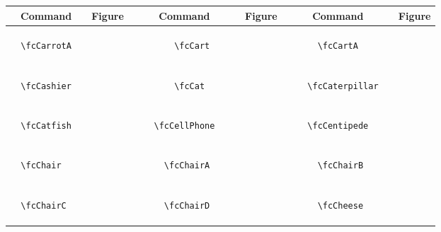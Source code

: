 \documentclass[x11names]{article}
\begin{document}
\begin{table}[H]\centering\begin{tabular}{|c|c|c|c|c|c|}\hline{\bf Command} & {\bf Figure} & {\bf Command} & {\bf Figure} & {\bf Command} & {\bf Figure}\\	\hline	&\multirow{5}{*}{	\fcCarrotA	[scale=0.4]} & &\multirow{5}{*}{	\fcCart	[scale=0.4]} & &\multirow{5}{*}{	\fcCartA	[scale=0.4]}\\	& & & & & \\	& & & & & \\	\verb|	\fcCarrotA	| & & \verb|	\fcCart	| & & \verb|	\fcCartA	| & \\	& & & & & \\	& & & & & \\	& & & & & \\	\hline									
		&\multirow{5}{*}{	\fcCashier	[scale=0.4]} & &\multirow{5}{*}{	\fcCat	[scale=0.8]} & &\multirow{5}{*}{	\fcCaterpillar	[scale=0.3]}\\	& & & & & \\	& & & & & \\	\verb|	\fcCashier	| & & \verb|	\fcCat	| & & \verb|	\fcCaterpillar	| & \\	& & & & & \\	& & & & & \\	& & & & & \\	\hline									
		&\multirow{5}{*}{	\fcCatfish	[scale=0.4]} & &\multirow{5}{*}{	\fcCellPhone	[scale=0.4]} & &\multirow{5}{*}{	\fcCentipede	[scale=0.6]}\\	& & & & & \\	& & & & & \\	\verb|	\fcCatfish	| & & \verb|	\fcCellPhone	| & & \verb|	\fcCentipede	| & \\	& & & & & \\	& & & & & \\	& & & & & \\	\hline									
		&\multirow{5}{*}{	\fcChair	[scale=0.4]} & &\multirow{5}{*}{	\fcChairA	[scale=0.4]} & &\multirow{5}{*}{	\fcChairB	[scale=0.4]}\\	& & & & & \\	& & & & & \\	\verb|	\fcChair	| & & \verb|	\fcChairA	| & & \verb|	\fcChairB	| & \\	& & & & & \\	& & & & & \\	& & & & & \\	\hline									
		&\multirow{5}{*}{	\fcChairC	[scale=0.3]} & &\multirow{5}{*}{	\fcChairD	[scale=0.3]} & &\multirow{5}{*}{	\fcCheese	[scale=0.4]}\\	& & & & & \\	& & & & & \\	\verb|	\fcChairC	| & & \verb|	\fcChairD	| & & \verb|	\fcCheese	| & \\	& & & & & \\	& & & & & \\	& & & & & \\	\hline									

\end{tabular}
\end{table}
\end{document}
